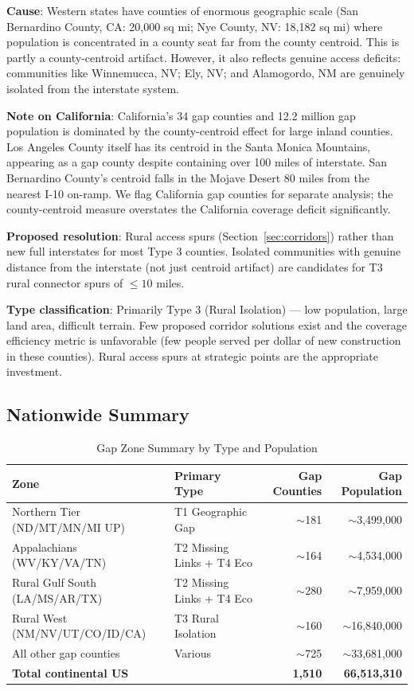 \textbf{Cause}: Western states have counties of enormous geographic scale (San Bernardino County, CA: 20,000 sq mi; Nye County, NV: 18,182 sq mi) where population is concentrated in a county seat far from the county centroid. This is partly a county-centroid artifact. However, it also reflects genuine access deficits: communities like Winnemucca, NV; Ely, NV; and Alamogordo, NM are genuinely isolated from the interstate system.

\textbf{Note on California}: California's 34 gap counties and 12.2 million gap population is dominated by the county-centroid effect for large inland counties. Los Angeles County itself has its centroid in the Santa Monica Mountains, appearing as a gap county despite containing over 100 miles of interstate. San Bernardino County's centroid falls in the Mojave Desert 80 miles from the nearest I-10 on-ramp. We flag California gap counties for separate analysis; the county-centroid measure overstates the California coverage deficit significantly.

\textbf{Proposed resolution}: Rural access spurs (Section~\ref{sec:corridors}) rather than new full interstates for most Type 3 counties. Isolated communities with genuine distance from the interstate (not just centroid artifact) are candidates for T3 rural connector spurs of $\leq 10$ miles.

\textbf{Type classification}: Primarily Type 3 (Rural Isolation) --- low population, large land area, difficult terrain. Few proposed corridor solutions exist and the coverage efficiency metric is unfavorable (few people served per dollar of new construction in these counties). Rural access spurs at strategic points are the appropriate investment.

\subsection{Nationwide Summary}

\begin{table}[h!]
\centering
\caption{Gap Zone Summary by Type and Population}
\label{tab:zones}
\begin{tabular}{llrr}
\toprule
\textbf{Zone} & \textbf{Primary Type} & \textbf{Gap Counties} & \textbf{Gap Population} \\
\midrule
Northern Tier (ND/MT/MN/MI UP) & T1 Geographic Gap & $\sim$181 & $\sim$3,499,000 \\
Appalachians (WV/KY/VA/TN) & T2 Missing Links + T4 Eco & $\sim$164 & $\sim$4,534,000 \\
Rural Gulf South (LA/MS/AR/TX) & T2 Missing Links + T4 Eco & $\sim$280 & $\sim$7,959,000 \\
Rural West (NM/NV/UT/CO/ID/CA) & T3 Rural Isolation & $\sim$160 & $\sim$16,840,000 \\
All other gap counties & Various & $\sim$725 & $\sim$33,681,000 \\
\midrule
\textbf{Total continental US} & & \textbf{1,510} & \textbf{66,513,310} \\
\bottomrule
\end{tabular}
\end{table}
